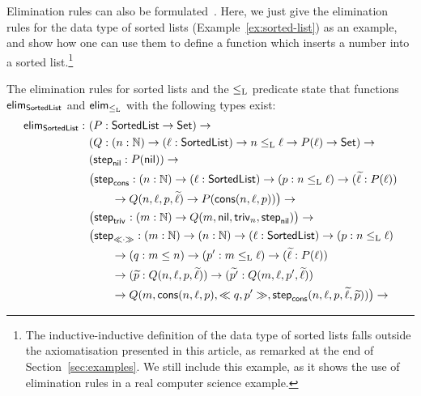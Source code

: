 \documentclass{schwicht}
\begin{document}
Elimination rules can also be
formulated~\cite{nordvallforsbergAltenkirchMorrisSetzer2011catsemindind}. Here,
we just give the elimination rules for the data type of sorted lists
(Example~\ref{ex:sorted-list}) as an example, and show how one can use
them to define a function which inserts a number into a sorted
list.\footnote{The inductive-inductive definition of the data type of
  sorted lists falls outside the axiomatisation presented in this
  article, as remarked at the end of Section~\ref{sec:examples}. We
  still include this example, as it shows the use of elimination rules
  in a real computer science example.}

\begin{example}
  The elimination rules for sorted lists and the $\leq_{\text{L}}$ predicate
  state that functions $\mathsf{elim}_{\mathsf{SortedList}}$ and $\mathsf{elim}_{\leq_{\text{L}}}$
  with the following types exist:
  \begin{align*}
    \elim_{\SortedList} :\ & (P : \SortedList \to \Set) \to \\
                       & (Q : (n : \Nat) \to (\ell : \SortedList) \to n \lessList \ell \to P(\ell) \to \Set) \to \\
                       & (\stepind{\nilList} : P(\nilList)) \to \\
                       & \big(\stepind{\consListbare} : (n : \Nat) \to (\ell : \SortedList) \to (p : n \lessList \ell) \to (\stepindarg{\ell} : P(\ell)) \\
                       & \qquad \to Q(n, \ell, p, \stepindarg{\ell}) \to P(\consList{n}{\ell}{p})\big) \to \\
                       & \big(\stepind{\nilLess{}} : (m : \Nat) \to Q(m, \nilList, \nilLess{n}, \stepind{\nilList})\big) \to \\
                       & \big(\stepind{\consLessbare} : (m : \Nat) \to (n : \Nat) \to (\ell : \SortedList) \to (p : n \lessList \ell) \\
                       & \qquad \to (q : m \leq n) \to (p' : m \lessList \ell) \to
                       (\stepindarg{\ell} : P(\ell)) \\ 
                       & \qquad \to (\stepindarg{p} : Q(n, \ell,p, \stepindarg{\ell}))
                       \to (\stepindarg{p'} : Q(m, \ell, p', \stepindarg{\ell})) \\
                       & \qquad \to Q(m,\consList{n}{\ell}{p}, \consLess{m}{n}{\ell}{p}{q}{p'}, \stepind{\consListbare}(n, \ell, p, \stepindarg{\ell}, \stepindarg{p}))\big) \to \\

\end{align*}
\end{example}
\end{document}
